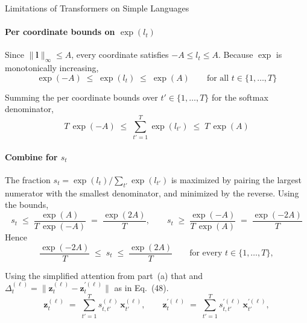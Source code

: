 \begin{question}{Limitations of Transformers on Simple Languages}
\begin{subquestion}
    \paragraph{Per coordinate bounds on $\exp(l_t)$}
    Since $\|\mathbf{l}\|_{\infty} \le A$, every coordinate satisfies $-A \le l_t \le A$. 
    Because $\exp$ is monotonically increasing,
    \begin{equation*}
        \exp(-A) \;\le\; \exp(l_t) \;\le\; \exp(A) \qquad \text{for all } t \in \{1, \dots, T\}
    \end{equation*}

    Summing the per coordinate bounds over $t' \in \{1, \dots, T\}$ for the softmax denominator,
    \begin{equation*}
        T\,\exp(-A) \;\le\; \sum_{t'=1}^{T} \exp(l_{t'}) \;\le\; T\,\exp(A)
    \end{equation*}

    \paragraph{Combine for $s_t$}
    The fraction $s_t = \exp(l_t) / \sum_{t'} \exp(l_{t'})$ is maximized by pairing the largest numerator with the smallest denominator, and minimized by the reverse. 
    Using the bounds,
    \begin{equation*}
        s_t \;\le\; \frac{\exp(A)}{T\,\exp(-A)} \;=\; \frac{\exp(2A)}{T},
        \qquad
        s_t \;\ge\; \frac{\exp(-A)}{T\,\exp(A)} \;=\; \frac{\exp(-2A)}{T}
    \end{equation*}
    Hence
    \begin{equation*}
        \frac{\exp(-2A)}{T} \;\le\; s_t \;\le\; \frac{\exp(2A)}{T} \qquad \text{for every } t \in \{1, \dots, T\},
    \end{equation*}
\end{subquestion}

\begin{subquestion}
    Using the simplified attention from part~(a) that and $\Delta_t^{(\ell)} = \|\mathbf{z}_t^{(\ell)} - \mathbf{z}_t^{\prime(\ell)}\|$ as in Eq.~(48).
    \begin{equation*}
        \mathbf{z}_t^{(\ell)} \;=\; \sum_{t'=1}^{T} s_{t,t'}^{(\ell)}\, \mathbf{x}_{t'}^{(\ell)},
        \qquad
        \mathbf{z}_t^{\prime(\ell)} \;=\; \sum_{t'=1}^{T} s_{t,t'}^{\prime(\ell)}\, \mathbf{x}_{t'}^{\prime(\ell)},
    \end{equation*}

\end{subquestion}
\end{question}
